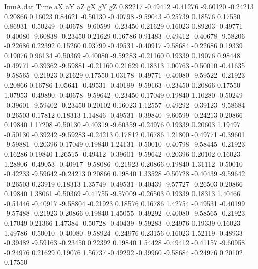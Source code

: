 \begin{filecontents}{ImuA.dat}
Time aX aY aZ gX gY gZ
   0.82217   -0.49412   -0.41276   -9.60120   -0.24213    0.20866    0.16023
   0.84621   -0.50130   -0.40798   -9.59043   -0.25739    0.18576    0.17550
   0.86931   -0.50249   -0.40678   -9.60599   -0.23450    0.21629    0.16023
   0.89203   -0.49771   -0.40080   -9.60838   -0.23450    0.21629    0.16786
   0.91483   -0.49412   -0.40678   -9.58206   -0.22686    0.22392    0.15260
   0.93799   -0.49531   -0.40917   -9.58684   -0.22686    0.19339    0.19076
   0.96134   -0.50369   -0.40080   -9.59283   -0.21160    0.19339    0.19076
   0.98448   -0.49771   -0.39362   -9.59881   -0.21160    0.21629    0.18313
   1.00763   -0.50010   -0.41635   -9.58565   -0.21923    0.21629    0.17550
   1.03178   -0.49771   -0.40080   -9.59522   -0.21923    0.20866    0.16786
   1.05641   -0.49531   -0.40199   -9.59163   -0.23450    0.20866    0.17550
   1.07953   -0.49890   -0.40678   -9.59642   -0.23450    0.17049    0.19840
   1.10280   -0.50249   -0.39601   -9.59402   -0.23450    0.20102    0.16023
   1.12557   -0.49292   -0.39123   -9.58684   -0.26503    0.17812    0.18313
   1.14846   -0.49531   -0.39840   -9.60599   -0.24213    0.20866    0.19840
   1.17208   -0.50130   -0.40319   -9.60359   -0.24976    0.19339    0.20603
   1.19497   -0.50130   -0.39242   -9.59283   -0.24213    0.17812    0.16786
   1.21800   -0.49771   -0.39601   -9.59881   -0.20396    0.17049    0.19840
   1.24131   -0.50010   -0.40798   -9.58445   -0.21923    0.16286    0.19840
   1.26515   -0.49412   -0.39601   -9.59642   -0.20396    0.20102    0.16023
   1.28806   -0.49053   -0.40917   -9.58086   -0.21923    0.20866    0.19840
   1.31112   -0.50010   -0.42233   -9.59642   -0.24213    0.20866    0.19840
   1.33528   -0.50728   -0.40439   -9.59642   -0.26503    0.23919    0.18313
   1.35749   -0.49531   -0.40439   -9.57727   -0.26503    0.20866    0.19840
   1.38061   -0.50369   -0.41755   -9.57009   -0.26503    0.19339    0.18313
   1.40466   -0.51446   -0.40917   -9.58804   -0.21923    0.18576    0.16786
   1.42754   -0.49531   -0.40199   -9.57488   -0.21923    0.20866    0.19840
   1.45055   -0.49292   -0.40080   -9.58565   -0.21923    0.17049    0.21366
   1.47384   -0.50728   -0.40439   -9.59283   -0.24976    0.19339    0.16023
   1.49786   -0.50010   -0.40080   -9.58924   -0.24976    0.23156    0.16023
   1.52119   -0.48933   -0.39482   -9.59163   -0.23450    0.22392    0.19840
   1.54428   -0.49412   -0.41157   -9.60958   -0.24976    0.21629    0.19076
   1.56737   -0.49292   -0.39960   -9.58684   -0.24976    0.20102    0.17550

\end{filecontents}
